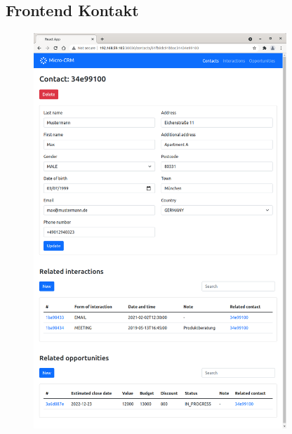 \clearpage
\subsection*{Frontend Kontakt}

\begin{figure}[H] 
    \centering
    \includegraphics[width=0.85\textwidth]{figures/FrontendKontakt.png}
\end{figure}

\clearpage
